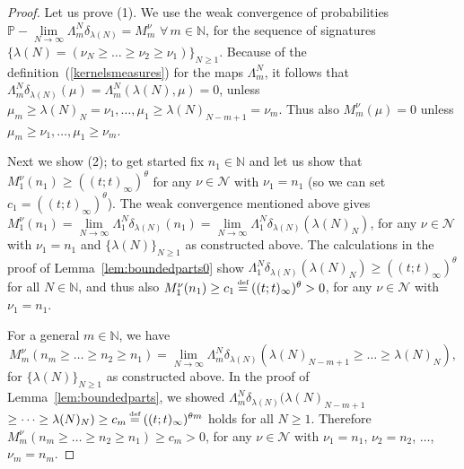 \documentclass[pdftex]{sigma}
\numberwithin{equation}{section}
\newcommand\myeq{\mathrel{\stackrel{\makebox[0pt]{\mbox{\normalfont\tiny def}}}{=}}}
\newcommand{\N}{\mathbb{N}}
\newcommand{\Nu}{\mathcal{N}}
\begin{document}
\begin{proof}
Let us prove (1). We use the weak convergence of probabilities $\mathbb{P}-\lim\limits_{N\rightarrow\infty}{\Lambda^N_m\delta_{\lambda(N)}} = M^{\nu}_m$ $\forall\, m\in\N$, for the sequence of signatures $\{\lambda(N) = (\nu_N \geq \dots \geq \nu_2 \geq \nu_1)\}_{N\geq 1}$. Because of the def\/inition~(\ref{kernelsmeasures}) for the maps $\Lambda^N_m$, it follows that $\Lambda^N_m\delta_{\lambda(N)}(\mu) = \Lambda^N_m(\lambda(N), \mu) = 0$, unless $\mu_m \geq \lambda(N)_N = \nu_1, \dots, \mu_1 \geq \lambda(N)_{N-m+1}=\nu_m$. Thus also $M^{\nu}_m(\mu) = 0$ unless $\mu_m \geq \nu_1, \dots, \mu_1 \geq \nu_m$.

Next we show (2); to get started f\/ix $n_1\in\N$ and let us show that $M^{\nu}_1(n_1) \geq ((t; t)_{\infty})^{\theta}$ for any $\nu\in\Nu$ with $\nu_1 = n_1$ (so we can set $c_1 = ((t; t)_{\infty})^{\theta}$). The weak convergence mentioned above gives $M_1^{\nu}(n_1) = \lim\limits_{N\rightarrow\infty}{\Lambda^N_1\delta_{\lambda(N)}(n_1)} = \lim\limits_{N\rightarrow\infty}{\Lambda^N_1\delta_{\lambda(N)}(\lambda(N)_N)}$, for any $\nu\in\Nu$ with $\nu_1 = n_1$ and $\{\lambda(N)\}_{N\geq 1}$ as constructed above. The calculations in the proof of Lemma~\ref{lem:boundedparts0} show $\Lambda^N_1 \delta_{\lambda(N)}(\lambda(N)_N) \geq ( (t; t)_{\infty} )^{\theta}$ for all $N\in\N$, and thus also $M^{\nu}_1(n_1) \geq c_1 \myeq ( (t; t)_{\infty} )^{\theta} > 0$, for any $\nu\in\Nu$ with $\nu_1 = n_1$.

For a general $m\in\N$, we have
\[
M_m^{\nu}(n_m \geq \dots \geq n_2 \geq n_1) = \lim_{N\rightarrow\infty}{\Lambda^N_m\delta_{\lambda(N)}(\lambda(N)_{N-m+1} \geq \dots \geq \lambda(N)_N)},
\]
for $\{\lambda(N)\}_{N\geq 1}$ as constructed above.
In the proof of Lemma~\ref{lem:boundedparts}, we showed $\Lambda^N_m\delta_{\lambda(N)}(\lambda(N)_{N-m+1}$ $\geq \cdots \geq \lambda(N)_N) \geq c_m \myeq ((t; t)_{\infty})^{\theta m}$ holds for all $N\geq 1$. Therefore $M_m^{\nu}(n_m \geq \dots \geq n_2 \geq n_1) \geq c_m > 0$, for any $\nu\in\Nu$ with $\nu_1 = n_1$, $\nu_2 = n_2$, $\dots$, $\nu_m = n_m$.


\end{proof}
\end{document}
